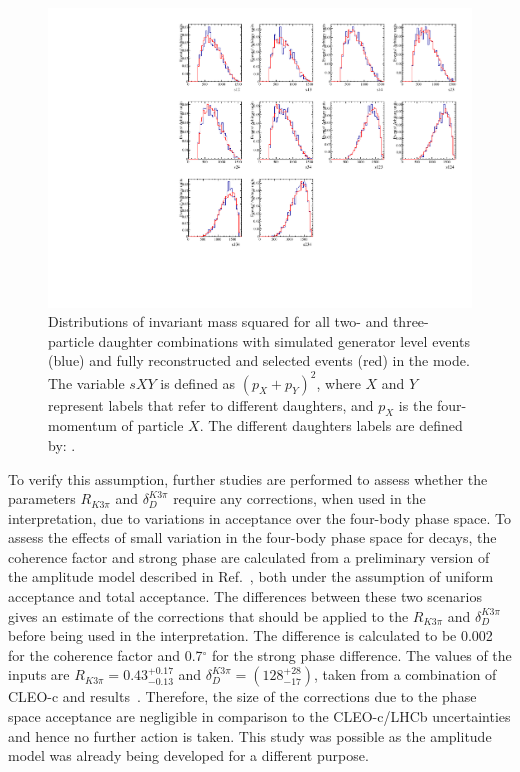 \begin{figure}[h]
\centering
\includegraphics[width=0.9\linewidth]{figures/results/dalitzDist_PiPiPiPi.pdf}
\caption{Distributions of invariant mass squared for all two- and three-particle \Dz daughter combinations with simulated generator level events (blue) and fully reconstructed and selected events (red) in the \pipipipi mode. The variable $sXY$ is defined as $(p_X + p_Y)^2$, where $X$ and $Y$ represent labels that refer to different \Dz daughters, and $p_X$ is the four-momentum of particle $X$. The different \Dz daughters labels are defined by: .}
\label{dalitz4pi}
\end{figure}

To verify this assumption, further studies are performed to assess whether the parameters $R_{K3\pi}$ and $\delta_D^{K3\pi}$ require any corrections, when used in the interpretation, due to variations in acceptance over the four-body phase space. To assess the effects of small variation in the four-body phase space for \kpipipi decays, the coherence factor and strong phase are calculated from a preliminary version of the \decay{\Dz}{\Km\pip\pim\pip} amplitude model described in Ref.~\cite{LHCb-PAPER-2017-040}, both under the assumption of uniform acceptance and total \lhcb acceptance. The differences between these two scenarios gives an estimate of the corrections that should be applied to the $R_{K3\pi}$ and $\delta_D^{K3\pi}$ before being used in the \lhcb interpretation. The difference is calculated to be 0.002 for the coherence factor and 0.7$^{\circ}$ for the strong phase difference. The values of the inputs are $R_{K3\pi} = 0.43^{+0.17}_{-0.13}$ and $\delta_D^{K3\pi} = \left(128^{+28}_{-17}\right)$, taken from a combination of CLEO-c and \lhcb results~\cite{charmk3pi,charmk3pi_errata,LHCb-PAPER-2015-057}. Therefore, the size of the corrections due to the \lhcb phase space acceptance are negligible in comparison to the CLEO-c/LHCb uncertainties and hence no further action is taken. This study was possible as the \decay{\Dz}{\Km\pip\pim\pip} amplitude model was already being developed for a different purpose.

